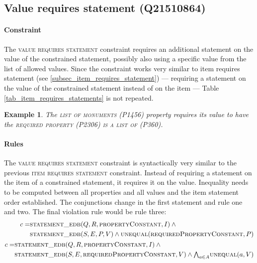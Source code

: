 \documentclass[hyperref,bachelorofscience,fleqn]{cgvpub}
\newtheorem{example}{Example}
\begin{document}
\subsection{Value requires statement (Q21510864)}\label{subsec_value_requires_statement}
\paragraph{Constraint}
The \textsc{value requires statement} constraint requires an additional statement on the value of the constrained statement, possibly also using a specific value from the list of allowed values. Since the constraint works very similar to item requires statement (see \ref{subsec_item_requires_statement}) --- requiring a statement on the value of the constrained statement instead of on the item --- Table \ref{tab_item_requires_statements} is not repeated.

\begin{example}
The \textsc{list of monuments} (P1456) property requires its value to have the \textsc{required property} (P2306) \textsc{is a list of} (P360).
\end{example}

\paragraph{Rules}
The \textsc{value requires statement} constraint is syntactically very similar to the previous \textsc{item requires statement} constraint. Instead of requiring a statement on the item of a constrained statement, it requires it on the value. Inequality needs to be computed between all properties and all values and the item statement order established. The conjunctions change in the first statement and rule one and two. The final violation rule would be rule three:
\begin{align}
\begin{split}
c = &\textsc{statement\_edb}(Q, R, \textsc{propertyConstant}, I) \wedge{} \\
&\textsc{statement\_edb}(S, E, P, V) \wedge \textsc{unequal}(\textsc{requiredPropertyConstant}, P)
\end{split}\\
\begin{split}
c = &\textsc{statement\_edb}(Q, R, \textsc{propertyConstant}, I) \wedge{} \\
&\textsc{statement\_edb}(S, E, \textsc{requiredPropertyConstant}, V) \wedge {\textstyle\bigwedge}_{a \in A} \textsc{unequal}(a, V)
\end{split}
\end{align}
\end{document}
